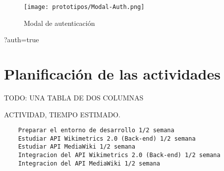 \begin{figure}[H]
    \centering
    \texttt{[image: prototipos/Modal-Auth.png]}
    \caption{Modal de autenticación}
    \label{ModalAuth}
\end{figure}
?auth=true

\section{Planificación de las actividades}

TODO: UNA TABLA DE DOS COLUMNAS

ACTIVIDAD, TIEMPO ESTIMADO.

\begin{lstlisting}
    Preparar el entorno de desarrollo 1/2 semana
    Estudiar API Wikimetrics 2.0 (Back-end) 1/2 semana
    Estudiar API MediaWiki 1/2 semana
    Integracion del API Wikimetrics 2.0 (Back-end) 1/2 semana
    Integracion del API MediaWiki 1/2 semana
\end{lstlisting}